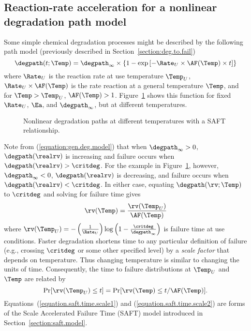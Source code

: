 \subsection{Reaction-rate acceleration for
a nonlinear degradation path model}
\label{section:nonlin.deg.acc}
Some simple chemical degradation processes might be described by the
following path model (previously described in
Section~\ref{section:deg.to.fail})
\begin{equation}
\label{equation:gen.deg.model}
\degpath(t;\Temp) = \degpath_{\infty} \times
\left \{1 -  \exp \left [-\Rate_{U} \times \AF(\Temp) \times t \right ] \right \}
\end{equation}
where $\Rate_{U}$ is the reaction rate at use temperature
$\Temp_{U}$, $\Rate_{U} \times \AF(\Temp)$ is the rate reaction at a
general temperature $\Temp$, and for $\Temp > \Temp_{U}$,
$\AF(\Temp)>1$.  Figure~\ref{figure:nonlinear.saft.example.ps} shows
this function for fixed $\Rate_{U}$, $\Ea$, and $\degpath_{\infty}$,
but at different temperatures.
\begin{figure}
\caption{Nonlinear degradation paths at different temperatures
with a SAFT relationship.}
\label{figure:nonlinear.saft.example.ps}
\end{figure}
Note from (\ref{equation:gen.deg.model}) that
when $\degpath_{\infty} > 0$, $\degpath(\realrv)$ is increasing
and failure occurs when $\degpath(\realrv) >
\critdeg$. For the example in
Figure~\ref{figure:nonlinear.saft.example.ps},
however, $\degpath_{\infty} < 0$, $\degpath(\realrv)$ is decreasing,
and failure occurs when $\degpath(\realrv) <
\critdeg$.
In either case, equating $\degpath(\rv;\Temp)$ to $\critdeg$ and solving
for failure time gives
\begin{equation}
\label{equation.saft.time.scale1}
{\rv}(\Temp) =\frac{{\rv}(\Temp_{U})}{\AF(\Temp)}
\end{equation}
where 
${\rv}(\Temp_{U})= - \left (\frac{1}{\Rate_{U}}\right ) \log \left(1-
\frac{\critdeg}{\degpath_{\infty}} \right )$ 
is failure time at use conditions. Faster degradation shortens time
to any particular definition of failure (e.g., crossing $\critdeg$
or some other specified level) by a {\em scale factor} that depends
on temperature.  Thus changing temperature is similar to changing
the units of time. Consequently, the time to failure distributions
at $\Temp_{U}$ and $\Temp$ are related by
\begin{equation}
\label{equation.saft.time.scale2}
\Pr[\rv(\Temp_{U}) \leq t] =
\Pr[\rv(\Temp) \leq t/\AF(\Temp)].
\end{equation} 
Equations~(\ref{equation.saft.time.scale1}) 
and (\ref{equation.saft.time.scale2}) 
are forms of the Scale Accelerated
Failure Time (SAFT) model introduced in
Section~\ref{section:saft.model}.  


